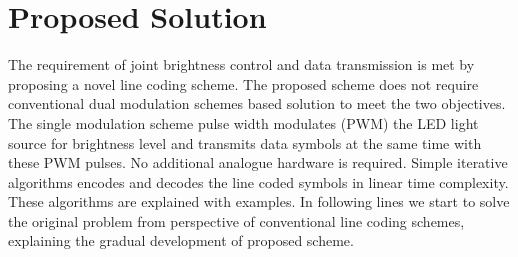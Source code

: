 \chapter{Proposed Solution} %
\label{Chapter3}



The requirement of joint brightness control and data transmission is met by proposing a novel line coding scheme. The proposed scheme does not require conventional dual modulation schemes based solution to meet the two objectives. The single modulation scheme pulse width modulates (PWM) the LED light source for brightness level and transmits data symbols at the same time with these PWM pulses. No additional analogue hardware is required. Simple iterative algorithms encodes and decodes the line coded symbols in linear time complexity. These algorithms are explained with examples. In following lines we start to solve the original problem from perspective of conventional line coding schemes, explaining the gradual development of proposed scheme.

